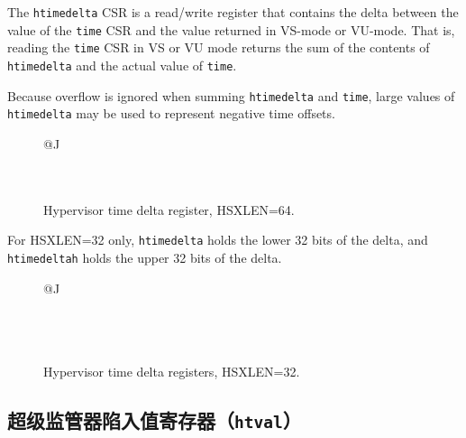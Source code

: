 The {\tt htimedelta} CSR is a read/write register that contains the delta
between the value of the {\tt time} CSR and the value returned in VS-mode or
VU-mode.
That is, reading the {\tt time} CSR in VS or VU mode returns the sum of the
contents of {\tt htimedelta} and the actual value of {\tt time}.

\begin{commentary}
Because overflow is ignored when summing {\tt htimedelta} and {\tt time},
large values of {\tt htimedelta} may be used to represent negative time
offsets.
\end{commentary}

\begin{figure*}[h!]
{\footnotesize
\begin{center}
\begin{tabular}{@{}J}
 \\
\hline
{} \\
 \\
\end{tabular}
\end{center}
}
\vspace{-0.1in}
\caption{Hypervisor time delta register, HSXLEN=64.}
\label{hdeltareg}
\end{figure*}

For HSXLEN=32 only, {\tt htimedelta} holds the lower 32 bits of the
delta, and {\tt htimedeltah} holds the upper 32 bits of the delta.

\begin{figure*}[h!]
{\footnotesize
\begin{center}
\begin{tabular}{@{}J}
 \\
\hline
{} \\
\hline
{} \\
 \\
\end{tabular}
\end{center}
}
\vspace{-0.1in}
\caption{Hypervisor time delta registers, HSXLEN=32.}
\label{hdeltahreg}
\end{figure*}

\subsection{超级监管器陷入值寄存器（{\tt htval}）}

